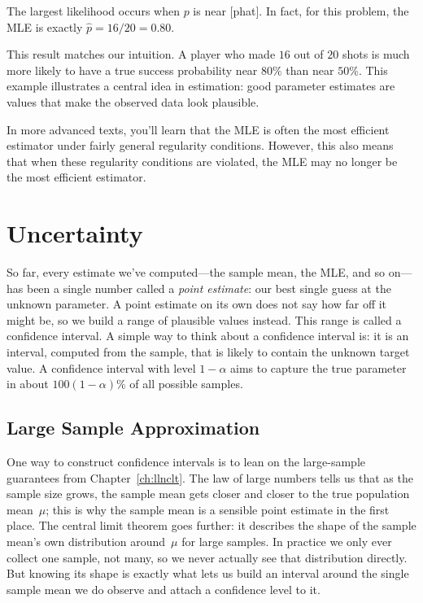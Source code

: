 \begin{example}[Maximum likelihood estimator]

The largest likelihood occurs when $p$ is near
[phat]. In fact, for this problem, the
MLE is exactly $\hat{p} = 16/20 = 0.80$.


This result matches our intuition. A player who made $16$ out of $20$
shots is much more likely to have a true success probability near $80\%$
than near $50\%$. This example illustrates a central idea in
estimation: good parameter estimates are values that make the observed
data look plausible.
\end{example}

In more advanced texts, you'll learn that the MLE is often the most
efficient estimator under fairly general regularity conditions. However,
this also means that when these regularity conditions are violated, the
MLE may no longer be the most efficient estimator.

\section{Uncertainty}
So far, every estimate we've computed---the sample mean, the MLE, and
so on---has been a single number called a \emph{point
estimate}: our best single guess at the unknown
parameter. A point estimate on its own does not say how far off it
might be, so we build a range of plausible values instead. This range is
called a confidence interval. A simple way to think about a confidence
interval is: it is an interval, computed from the sample, that is likely
to contain the unknown target value. A confidence interval with level
$1-\alpha$ aims to capture the true parameter in about
$100(1-\alpha)\%$ of all possible samples.



\subsection{Large Sample Approximation}
One way to construct confidence intervals is to lean on the large-sample
guarantees from Chapter~\ref{ch:llnclt}. The law of large numbers tells
us that as the sample size grows, the sample mean gets closer and
closer to the true population mean~$\mu$; this is why the sample mean
is a sensible point estimate in the first place. The central limit
theorem goes further: it describes the shape of the sample mean's own
distribution around~$\mu$ for large samples. In practice we only ever
collect one sample, not many, so we never actually see that distribution
directly. But knowing its shape is exactly what lets us build an
interval around the single sample mean we do observe and attach a
confidence level to it.

